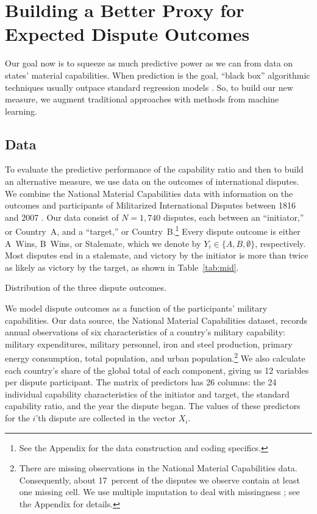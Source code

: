 \section{Building a Better Proxy for Expected Dispute Outcomes}
\label{sec:methods}

Our goal now is to squeeze as much predictive power as we can from data on states' material capabilities.
When prediction is the goal, ``black box'' algorithmic techniques usually outpace standard regression models \citep{Breiman:2001fd}.
So, to build our new measure, we augment traditional approaches with methods from machine learning.

\subsection{Data}

To evaluate the predictive performance of the capability ratio and then to build an alternative measure, we use data on the outcomes of international disputes.
We combine the National Material Capabilities data \citep{singer1972} with information on the outcomes and participants of Militarized International Disputes between 1816 and 2007 \citep{Palmer:2015hp}.
Our data consist of $N = 1{,}740$ disputes, each between an ``initiator,'' or Country~A, and a ``target,'' or Country~B.\footnote{%
  See the Appendix for the data construction and coding specifics.
}
Every dispute outcome is either A~Wins, B~Wins, or Stalemate, which we denote by $Y_i \in \{A, B, \emptyset\}$, respectively.
Most disputes end in a stalemate, and victory by the initiator is more than twice as likely as victory by the target, as shown in Table~\ref{tab:mid}.

\begin{table}[htp]
  \centering
  
  \caption{
    Distribution of the three dispute outcomes.
  }
  \label{tab:mid}
\end{table}

We model dispute outcomes as a function of the participants' military capabilities.
Our data source, the National Material Capabilities dataset, records annual observations of six characteristics of a country's military capability: military expenditures, military personnel, iron and steel production, primary energy consumption, total population, and urban population.\footnote{%
  There are missing observations in the National Material Capabilities data.
  Consequently, about 17~percent of the disputes we observe contain at least one missing cell.
  We use multiple imputation to deal with missingness \citep{honaker_what_2010}; see the Appendix for details.
}
We also calculate each country's share of the global total of each component, giving us 12 variables per dispute participant.
The matrix of predictors has 26 columns: the 24 individual capability characteristics of the initiator and target, the standard capability ratio, and the year the dispute began.
The values of these predictors for the $i$'th dispute are collected in the vector $X_i$.

